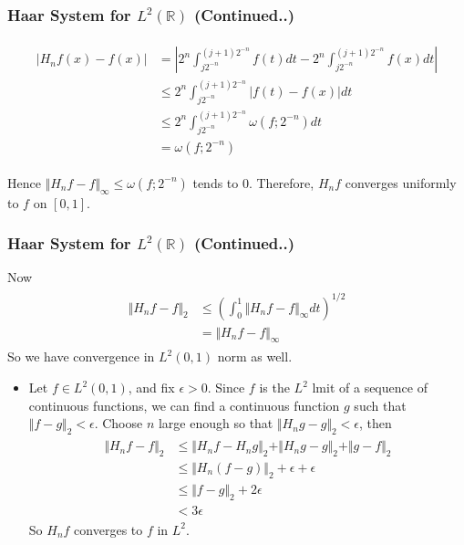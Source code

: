 \documentclass{beamer}
\begin{document}
\begin{frame}
    \frametitle{ Haar System for  $L^2\left({\mathbb{R}}\right)$ (Continued..)}
    \begin{eqnarray*}
        \begin{split}
            |H_nf(x) - f(x)| &= |2^n\int_{j2^{-n}}^{(j+1)2^{-n}}f(t)dt-2^n\int_{j2^{-n}}^{(j+1)2^{-n}}f(x)dt| \\
            &\le 2^n \int_{j2^{-n}}^{(j+1)2^{-n}}|f(t) - f(x)|dt \\
            &\le 2^n \int_{j2^{-n}}^{(j+1)2^{-n}}\omega(f;2^{-n})dt \\
            &= \omega(f;2^{-n})
        \end{split}
    \end{eqnarray*}

    Hence $\Vert H_nf - f \Vert_{\infty} \le \omega(f;2^{-n})$ tends to 0. Therefore, $H_nf$ converges uniformly to $f$ on $[0, 1]$.
\end{frame}


\begin{frame}
    \frametitle{Haar System for  $L^2\left({\mathbb{R}}\right)$ (Continued..)}
    Now
    \begin{eqnarray*}
        \begin{split}
            \Vert H_nf - f \Vert_{2} &\le \left(\int_0^1 \Vert H_nf - f \Vert_{\infty}dt \right)^{1/2}\\
            &= \Vert H_nf - f \Vert_{\infty}
        \end{split}
    \end{eqnarray*}
So we have convergence in $L^2(0,1)$ norm as well.
\begin{itemize}
    \item Let  $f \in L^2(0,1)$, and fix $ \epsilon > 0$. Since $f$ is the $L^2$ lmit of a sequence of 
    continuous functions, we can find a continuous function $g$ such that $\Vert f - g \Vert_2 < \epsilon$. Choose $n$ large enough so that
    $\Vert H_ng - g \Vert_2 < \epsilon$, then
    \begin{eqnarray*}
        \begin{split}
            \Vert H_nf - f \Vert_{2} &\le \Vert H_nf - H_ng \Vert_2 + \Vert H_ng- g \Vert_2  + \Vert g -f \Vert_2 \\
            &\le \Vert H_n(f- g)\Vert_2 + \epsilon + \epsilon \\
            &\le \Vert f- g\Vert_2 +  2\epsilon \\
            &< 3\epsilon
        \end{split}
    \end{eqnarray*}
    So $H_nf$ converges to $f$  in $L^2$.
\end{itemize}
\end{frame}
    
\end{document}
